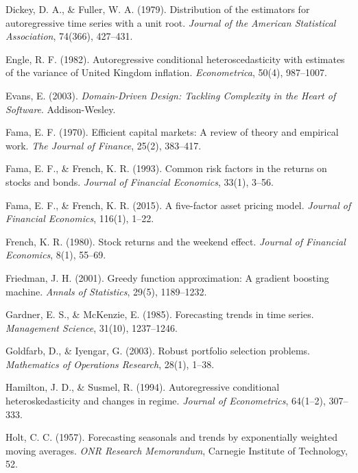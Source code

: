 \documentclass[12pt, a4paper, oneside]{report}
\begin{document}
\begin{enumerate}[label={[\arabic*]}, nosep, leftmargin=*, itemsep=4pt]
\item Dickey, D. A., \& Fuller, W. A. (1979). Distribution of the estimators for autoregressive time series with a unit root. \textit{Journal of the American Statistical Association}, 74(366), 427--431.

\item Engle, R. F. (1982). Autoregressive conditional heteroscedasticity with estimates of the variance of United Kingdom inflation. \textit{Econometrica}, 50(4), 987--1007.

\item Evans, E. (2003). \textit{Domain-Driven Design: Tackling Complexity in the Heart of Software}. Addison-Wesley.

\item Fama, E. F. (1970). Efficient capital markets: A review of theory and empirical work. \textit{The Journal of Finance}, 25(2), 383--417.

\item Fama, E. F., \& French, K. R. (1993). Common risk factors in the returns on stocks and bonds. \textit{Journal of Financial Economics}, 33(1), 3--56.

\item Fama, E. F., \& French, K. R. (2015). A five-factor asset pricing model. \textit{Journal of Financial Economics}, 116(1), 1--22.

\item French, K. R. (1980). Stock returns and the weekend effect. \textit{Journal of Financial Economics}, 8(1), 55--69.

\item Friedman, J. H. (2001). Greedy function approximation: A gradient boosting machine. \textit{Annals of Statistics}, 29(5), 1189--1232.

\item Gardner, E. S., \& McKenzie, E. (1985). Forecasting trends in time series. \textit{Management Science}, 31(10), 1237--1246.

\item Goldfarb, D., \& Iyengar, G. (2003). Robust portfolio selection problems. \textit{Mathematics of Operations Research}, 28(1), 1--38.

\item Hamilton, J. D., \& Susmel, R. (1994). Autoregressive conditional heteroskedasticity and changes in regime. \textit{Journal of Econometrics}, 64(1--2), 307--333.

\item Holt, C. C. (1957). Forecasting seasonals and trends by exponentially weighted moving averages. \textit{ONR Research Memorandum}, Carnegie Institute of Technology, 52.


\end{enumerate}
\end{document}
